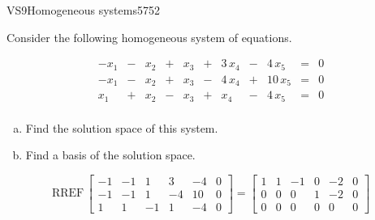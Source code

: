\begin{exercise}{VS9}{Homogeneous systems}{5752} 
\begin{exerciseStatement} 

Consider the following homogeneous system of equations.

 \[\begin{matrix}
 -x_{1} &  -  & x_{2} &  +  & x_{3} &  +  & 3 \, x_{4} &  -  & 4 \, x_{5} & = & 0 \\
 -x_{1} &  -  & x_{2} &  +  & x_{3} &  -  & 4 \, x_{4} &  +  & 10 \, x_{5} & = & 0 \\
 x_{1} &  +  & x_{2} &  -  & x_{3} &  +  & x_{4} &  -  & 4 \, x_{5} & = & 0 \\
 \end{matrix}\] 

\begin{enumerate}[(a)]
\item  Find the solution space of this system.
\item  Find a basis of the solution space.
\end{enumerate}

     \end{exerciseStatement}
 \begin{exerciseAnswer} 

\[\mathrm{RREF}\,\left[\begin{array}{ccccc|c}
-1 & -1 & 1 & 3 & -4 & 0 \\
-1 & -1 & 1 & -4 & 10 & 0 \\
1 & 1 & -1 & 1 & -4 & 0
\end{array}\right]=\left[\begin{array}{ccccc|c}
1 & 1 & -1 & 0 & -2 & 0 \\
0 & 0 & 0 & 1 & -2 & 0 \\
0 & 0 & 0 & 0 & 0 & 0
\end{array}\right]\]

 


\end{exerciseAnswer}
\end{exercise}
